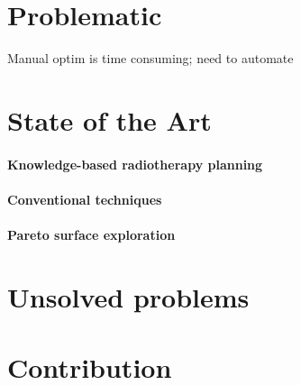 \section{Problematic}
Manual optim is time consuming; need to automate

\section{State of the Art}
\paragraph{Knowledge-based radiotherapy planning}

\paragraph{Conventional techniques}

\paragraph{Pareto surface exploration}

\section{Unsolved problems}

\section{Contribution}
